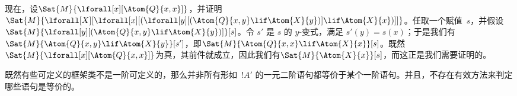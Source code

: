 \documentclass[../../../include/open-logic-section]{subfiles}
\begin{document}
现在，设$\Sat{M}{\lforall[x][\Atom{Q}{x,x}]}$，并证明$\Sat{M}{\lforall[X][\lforall[x][(\lforall[y][(\Atom{Q}{x,y} \lif
        \Atom{X}{y})] \lif \Atom{X}{x})]]}$。任取一个赋值~$s$，并假设$\Sat{M}{\lforall[y][(\Atom{Q}{x,y} \lif
    \Atom{X}{y})]}[s]$。令 $s'$ 是 $s$ 的 $y$-变式，满足 $s'(y) = s(x)$；于是我们有$\Sat{M}{\Atom{Q}{x,y} \lif \Atom{X}{y}}[s']$，即$\Sat{M}{\Atom{Q}{x,x} \lif \Atom{X}{x}}[s]$。既然$\Sat{M}{\lforall[x][\Atom{Q}{x,x}]}$为真，其前件就成立，因此我们有$\Sat{M}{\Atom{X}{x}}[s]$，而这正是我们需要证明的。

既然有些可定义的框架类不是一阶可定义的，那么并非所有形如~$!A'$ 的一元二阶语句都等价于某个一阶语句。并且，不存在有效方法来判定哪些语句是等价的。
\end{document}
